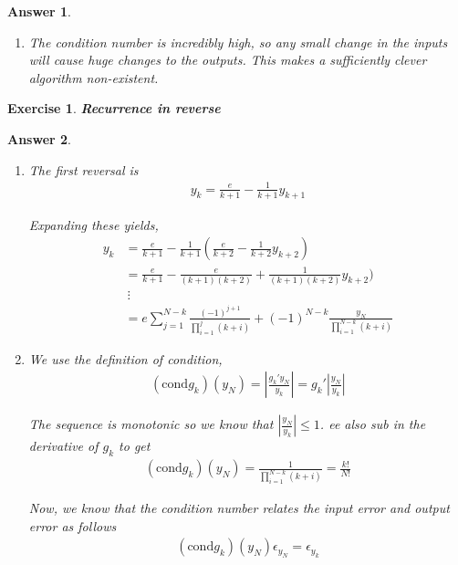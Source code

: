 \documentclass[12pt]{article}
\theoremstyle{colon}
\newtheorem{exercise}{Exercise}
\newtheorem*{answer}{Answer}
\begin{document}
\begin{answer}
\begin{enumerate}[label=\alph*)]
\begin{enumerate}[label=\roman*)]
        \item The condition number is incredibly high, so any small change in the inputs will cause huge changes to the outputs. This makes a sufficiently clever algorithm non-existent.
      \end{enumerate}
  \end{enumerate}
\end{answer}

\clearpage

\begin{exercise}
  \textbf{Recurrence in reverse}
\end{exercise}

\begin{answer}
  \

  \begin{enumerate}[label=\alph*)]
    \item The first reversal is
      \begin{gather*}
        y_k = \frac{e}{k+1} - \frac{1}{k+1}y_{k+1}
      \end{gather*}

      Expanding these yields,
      \begin{align*}
        y_k &= \frac{e}{k+1} - \frac{1}{k+1}(\frac{e}{k+2} - \frac{1}{k+2}y_{k+2} ) \\
        &= \frac{e}{k+1} - \frac{e}{(k+1)(k+2)} + \frac{1}{(k+1)(k+2)}y_{k+2} ) \\
        &\ \vdots \\
        &= e \sum_{j=1}^{N-k} \frac{(-1)^{j+1}}{\prod_{i=1}^j (k+i)} + (-1)^{N-k} \frac{y_N}{\prod_{i=1}^{N-k} (k+i)}
      \end{align*}

    \item We use the definition of condition,
      \begin{gather*}
        (\text{cond} g_k)(y_N) = \left\lvert \frac{g_k' y_N}{y_k} \right\rvert = g_k' \left\lvert \frac{y_N}{y_k} \right\rvert
      \end{gather*}

      The sequence is monotonic so we know that $\left\lvert \frac{y_N}{y_k} \right\rvert \leq 1$. ee also sub in the derivative of $g_k$ to get
      \begin{gather*}
        (\text{cond} g_k)(y_N) = \frac{1}{\prod_{i=1}^{N-k} (k+i)} = \frac{k!}{N!}
      \end{gather*}

      Now, we know that the condition number relates the input error and output error as follows
      \begin{gather*}
        (\text{cond} g_k)(y_N) \epsilon_{y_N} = \epsilon_{y_k}
      \end{gather*}


\end{enumerate}
\end{answer}
\end{document}
